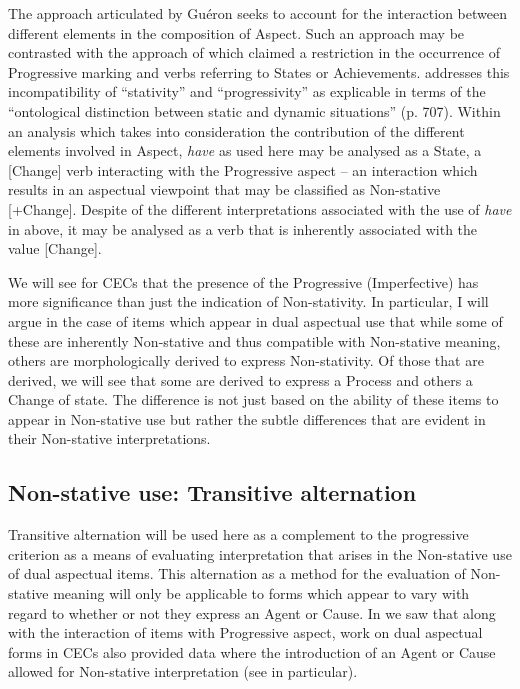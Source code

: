The approach articulated by Guéron seeks to account for the interaction between different elements in the composition of Aspect. Such an approach may be contrasted with the approach of \citet{Vendler1967} which claimed a restriction in the occurrence of Progressive marking and verbs referring to States or Achievements. \citet{Lyons1977} addresses this incompatibility of ``stativity'' and ``progressivity'' as explicable in terms of the ``ontological distinction between static and dynamic situations'' (p. 707). Within an analysis which takes into consideration the contribution of the different elements involved in Aspect, \textit{have} as used here may be analysed as a State, a [\textminus Change] verb interacting with the Progressive aspect -- an interaction which results in an aspectual viewpoint that may be classified as Non-stative [+Change]. Despite of the different interpretations associated with the use of \textit{have} in  above, it may be analysed as a verb that is inherently associated with the value [\textminus Change].

We will see for CECs that the presence of the Progressive (Imperfective) has more significance than just the indication of Non-stativity. In particular, I will argue in the case of items which appear in dual aspectual use that while some of these are inherently Non-stative and thus compatible with Non-stative meaning, others are morphologically derived to express Non-stativity. Of those that are derived, we will see that some are derived to express a Process and others a Change of state. The difference is not just based on the ability of these items to appear in Non-stative use but rather the subtle differences that are evident in their Non-stative interpretations. 

\subsection{Non-stative use: Transitive alternation}\label{sec:5.1.2}
Transitive alternation will be used here as a complement to the progressive criterion as a means of evaluating interpretation that arises in the Non-stative use of dual aspectual items. This alternation as a method for the evaluation of Non-stative meaning will only be applicable to forms which appear to vary with regard to whether or not they express an Agent or Cause. In  we saw that along with the interaction of items with Progressive aspect, work on dual aspectual forms in CECs also provided data where the introduction of an Agent or Cause allowed for Non-stative interpretation (see  in particular).

